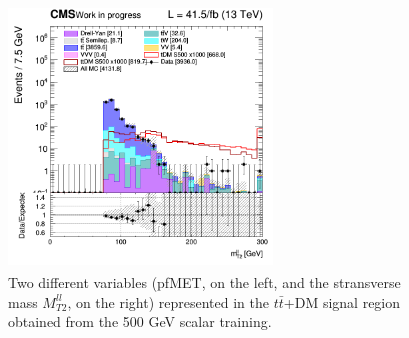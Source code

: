 \documentclass[a4paper, 10pt, openright]{report}
\begin{document}
\begin{figure}[htbp]
{\begin{minipage}[b]{.48\textwidth}
\end{minipage}\hfill
\begin{minipage}[b]{.48\textwidth}
\includegraphics[width=7cm, height=7cm]{figs/2017/SmearSR-ttDM-scalar500/log_cratio_TTbar_topCR_ll_BDT_ttDM500_mt2ll.png}
\end{minipage} \hfill
}
\caption{Two different variables (pf\ac{MET}, on the left, and the stransverse mass $M_{T2}^{ll}$, on the right) represented in the $t \bar t$+DM signal region obtained from the 500 GeV scalar training.}
\label{fig:SR4}
\end{figure}
\end{document}
